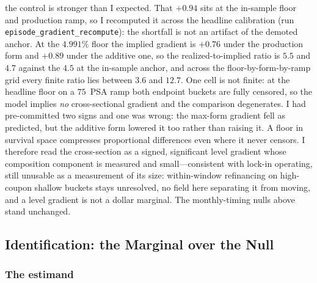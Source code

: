 \documentclass[12pt]{article}
\begin{document}
the control is stronger than I expected. That $+0.94$ sits at the in-sample floor and production ramp, so I recomputed it across the headline calibration (run \texttt{episode\_gradient\_recompute}): the shortfall is not an artifact of the demoted anchor. At the $4.991\%$ floor the implied gradient is $+0.76$ under the production form and $+0.89$ under the additive one, so the realized-to-implied ratio is $5.5$ and $4.7$ against the $4.5$ at the in-sample anchor, and across the floor-by-form-by-ramp grid every finite ratio lies between $3.6$ and $12.7$. One cell is not finite: at the headline floor on a $75$~PSA ramp both endpoint buckets are fully censored, so the model implies \emph{no} cross-sectional gradient and the comparison degenerates. I had pre-committed two signs and one was wrong: the max-form gradient fell as predicted, but the additive form lowered it too rather than raising it. A floor in survival space compresses proportional differences even where it never censors. I therefore read the cross-section as a signed, significant level gradient whose composition component is measured and small---consistent with lock-in operating, still unusable as a measurement of its size: within-window refinancing on high-coupon shallow buckets stays unresolved, no field here separating it from moving, and a level gradient is not a dollar marginal. The monthly-timing nulls above stand unchanged.
\subsection{Identification: the Marginal over the Null}\label{sec:identification}

\subsubsection{The estimand}
\end{document}
